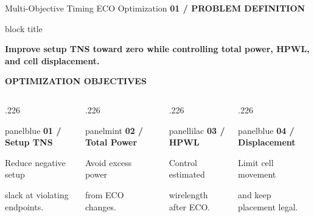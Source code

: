 \documentclass[aspectratio=169,10pt]{beamer}
\newcommand{\smalllabel}[1]{{\scriptsize\bfseries\color{Accent}\MakeUppercase{#1}}}
\newcommand{\takeaway}[1]{%
  \begin{beamercolorbox}[rounded=true,sep=0.15cm,wd=\linewidth]{block title}%
    \strut\textbf{#1}\strut
  \end{beamercolorbox}%
}
\newcommand{\slideposition}{}
\newcommand{\slidesubtitle}[1]{%
  \smalllabel{#1}%
}
\begin{document}
\renewcommand{\slideposition}{Summary 6 / 18}
\begin{frame}[label=summary-6]{Multi-Objective Timing ECO Optimization}
  \vspace{.01cm}
  \slidesubtitle{01 / Problem Definition}\par\vspace{.10cm}
  \takeaway{Improve setup TNS toward zero while controlling total power, HPWL, and cell displacement.}
  \vspace{.14cm}

  \smalllabel{Optimization Objectives}\par\vspace{.08cm}
  \begin{columns}[T,onlytextwidth]
    \begin{column}{.226\textwidth}
      \begin{beamercolorbox}[rounded=true,sep=.14cm,wd=\linewidth]{panelblue}
        {\small\bfseries\color{AccentBlue}01 / Setup TNS}\par\vspace{.11cm}
        {\scriptsize Reduce negative setup\par slack at violating endpoints.}
      \end{beamercolorbox}
    \end{column}
    \begin{column}{.226\textwidth}
      \begin{beamercolorbox}[rounded=true,sep=.14cm,wd=\linewidth]{panelmint}
        {\small\bfseries\color{Accent}02 / Total Power}\par\vspace{.11cm}
        {\scriptsize Avoid excess power\par from ECO changes.}
      \end{beamercolorbox}
    \end{column}
    \begin{column}{.226\textwidth}
      \begin{beamercolorbox}[rounded=true,sep=.14cm,wd=\linewidth]{panellilac}
        {\small\bfseries\color{AccentBlue}03 / HPWL}\par\vspace{.11cm}
        {\scriptsize Control estimated\par wirelength after ECO.}
      \end{beamercolorbox}
    \end{column}
    \begin{column}{.226\textwidth}
      \begin{beamercolorbox}[rounded=true,sep=.14cm,wd=\linewidth]{panelblue}
        {\small\bfseries\color{Accent}04 / Displacement}\par\vspace{.11cm}
        {\scriptsize Limit cell movement\par and keep placement legal.}
      \end{beamercolorbox}
    \end{column}
  \end{columns}


\end{frame}
\end{document}
